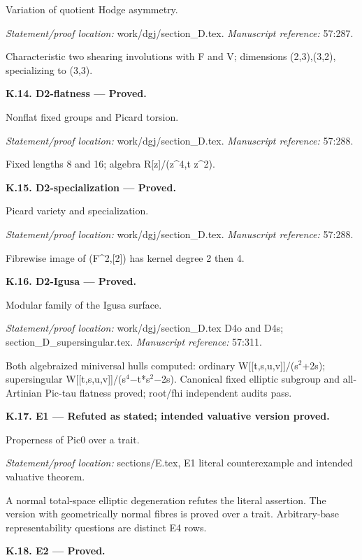 Variation of quotient Hodge asymmetry.
\par\emph{Statement/proof location:} work/dgj/section\_D.tex.
\emph{Manuscript reference:} 57:287.
\par Characteristic two shearing involutions with F and V; dimensions (2,3),(3,2), specializing to (3,3).
\par\medskip\noindent\textbf{K.14. D2-flatness --- Proved.}\par
Nonflat fixed groups and Picard torsion.
\par\emph{Statement/proof location:} work/dgj/section\_D.tex.
\emph{Manuscript reference:} 57:288.
\par Fixed lengths 8 and 16; algebra R[z]/(z\textasciicircum{}4,t z\textasciicircum{}2).
\par\medskip\noindent\textbf{K.15. D2-specialization --- Proved.}\par
Picard variety and specialization.
\par\emph{Statement/proof location:} work/dgj/section\_D.tex.
\emph{Manuscript reference:} 57:288.
\par Fibrewise image of (F\textasciicircum{}2,[2]) has kernel degree 2 then 4.
\par\medskip\noindent\textbf{K.16. D2-Igusa --- Proved.}\par
Modular family of the Igusa surface.
\par\emph{Statement/proof location:} work/dgj/section\_D.tex D4o and D4s; section\_D\_supersingular.tex.
\emph{Manuscript reference:} 57:311.
\par Both algebraized miniversal hulls computed: ordinary W[[t,s,u,v]]/(s\ensuremath{{}^2}+2s); supersingular W[[t,s,u,v]]/(s\ensuremath{{}^4}−t*s\ensuremath{{}^2}−2s). Canonical fixed elliptic subgroup and all-Artinian Pic-tau flatness proved; root/fhi independent audits pass.
\par\medskip\noindent\textbf{K.17. E1 --- Refuted as stated; intended valuative version proved.}\par
Properness of Pic0 over a trait.
\par\emph{Statement/proof location:} sections/E.tex, E1 literal counterexample and intended valuative theorem.
\par A normal total-space elliptic degeneration refutes the literal assertion. The version with geometrically normal fibres is proved over a trait. Arbitrary-base representability questions are distinct E4 rows.
\par\medskip\noindent\textbf{K.18. E2 --- Proved.}\par

